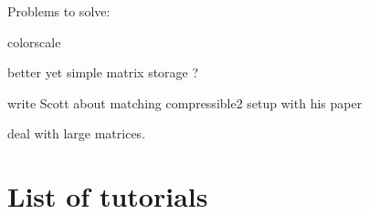\documentclass[a4paper]{article}
\begin{document}

\noindent Problems to solve:

colorscale 

better yet simple matrix storage ?

write Scott about matching compressible2 setup with his paper

deal with large matrices. 

\newpage
\section{List of tutorials}
\end{document}
